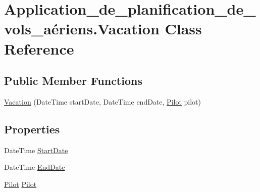 \hypertarget{class_application__de__planification__de__vols__a_xC3_xA9riens_1_1_vacation}{}\section{Application\+\_\+de\+\_\+planification\+\_\+de\+\_\+vols\+\_\+aériens.\+Vacation Class Reference}
\label{class_application__de__planification__de__vols__a_xC3_xA9riens_1_1_vacation}
\subsection*{Public Member Functions}
\begin{DoxyCompactItemize}
\item 
\hyperlink{class_application__de__planification__de__vols__a_xC3_xA9riens_1_1_vacation_abd1900c4e75c89a0a681c8fd83d6f6fc}{Vacation} (Date\+Time start\+Date, Date\+Time end\+Date, \hyperlink{class_application__de__planification__de__vols__a_xC3_xA9riens_1_1_pilot}{Pilot} pilot)
\end{DoxyCompactItemize}
\subsection*{Properties}
\begin{DoxyCompactItemize}
\item 
Date\+Time \hyperlink{class_application__de__planification__de__vols__a_xC3_xA9riens_1_1_vacation_a5ebeb112b3fffb8c5325ac0ce7000ad6}{Start\+Date}
\item 
Date\+Time \hyperlink{class_application__de__planification__de__vols__a_xC3_xA9riens_1_1_vacation_ae255a27724aa8d84aee0fa8ec23a4878}{End\+Date}
\item 
\hyperlink{class_application__de__planification__de__vols__a_xC3_xA9riens_1_1_pilot}{Pilot} \hyperlink{class_application__de__planification__de__vols__a_xC3_xA9riens_1_1_vacation_a87be5d673051905ea03c547cb55ec866}{Pilot}
\end{DoxyCompactItemize}


